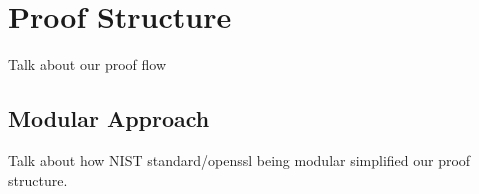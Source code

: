 \section{Proof Structure}\label{sec:proof}
Talk about our proof flow
\subsection{Modular Approach}
Talk about how NIST standard/openssl being modular simplified our proof structure.